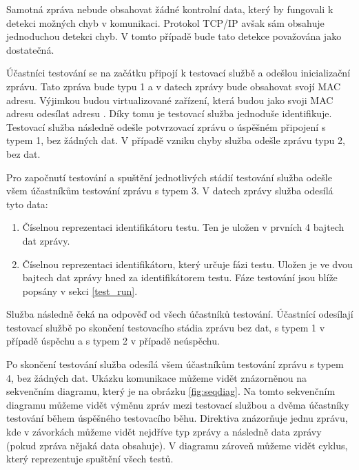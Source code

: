 Samotná zpráva nebude obsahovat žádné kontrolní data, který by fungovali k detekci možných chyb v komunikaci. Protokol TCP/IP avšak sám obsahuje jednoduchou detekci chyb. V tomto případě bude tato detekce považována jako dostatečná.

Účastníci testování se na začátku připojí k testovací službě a odešlou inicializační zprávu. Tato zpráva bude typu 1 a v datech zprávy bude obsahovat svojí MAC adresu. Výjimkou budou virtualizované zařízení, která budou jako svoji MAC adresu odesílat adresu . Díky tomu je testovací služba jednoduše identifikuje. Testovací služba následně odešle potvrzovací zprávu o úspěšném připojení s typem 1, bez žádných dat. V případě vzniku chyby služba odešle zprávu typu 2, bez dat. 

Pro započnutí testování a spuštění jednotlivých stádií testování služba odešle všem účastníkům testování zprávu s typem 3. V datech zprávy služba odesílá tyto data:

\begin{enumerate}
    \item Číselnou reprezentaci identifikátoru testu. Ten je uložen v prvních 4 bajtech dat zprávy.
    \item Číselnou reprezentaci identifikátoru, který určuje fázi testu. Uložen je ve dvou bajtech dat zprávy hned za identifikátorem testu. Fáze testování jsou blíže popsány v sekci \ref{test_run}.
\end{enumerate}

Služba následně čeká na odpověď od všech účastníků testování. Účastnící odesílají testovací službě po skončení testovacího stádia zprávu bez dat, s typem 1 v případě úspěchu a s typem 2 v případě neúspěchu. 

Po skončení testování služba odesílá všem účastníkům testování zprávu s typem 4, bez žádných dat. Ukázku komunikace můžeme vidět znázorněnou na sekvenčním diagramu, který je na obrázku \ref{fig:seqdiag}. Na tomto sekvenčním diagramu můžeme vidět výměnu zpráv mezi testovací službou a dvěma účastníky testování během úspěšného testovacího běhu. Direktiva  znázorňuje jednu zprávu, kde v závorkách můžeme vidět nejdříve typ zprávy a následně data zprávy (pokud zpráva nějaká data obsahuje). V diagramu zároveň můžeme vidět cyklus, který reprezentuje spuštění všech testů.

